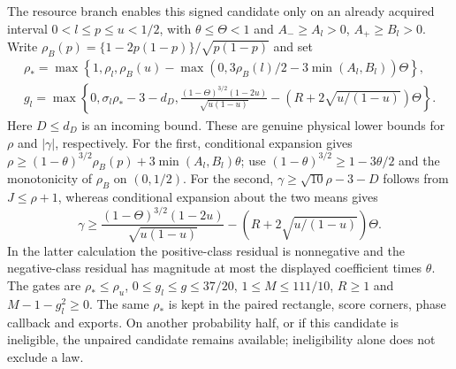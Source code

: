 The resource branch enables this signed candidate only on an already
acquired interval $0<l\le p\le u<1/2$, with $\theta\le\Theta<1$
and $A_-\ge A_l>0$, $A_+\ge B_l>0$.
Write $\rho_B(p)=\{1-2p(1-p)\}/\sqrt{p(1-p)}$ and set
\begin{gather*}
 \rho_* =\max\left\{1,\rho_l,\rho_B(u)
       -\max(0,3\rho_B(l)/2-3\min(A_l,B_l))\Theta\right\},\\
 g_l=\max\left\{0,\sigma_l\rho_*-3-d_D,
 \frac{(1-\Theta)^{3/2}(1-2u)}{\sqrt{u(1-u)}}
                -(R+2\sqrt{u/(1-u)})\Theta\right\}.
\end{gather*}
Here $D\le d_D$ is an incoming bound. These are genuine physical
lower bounds for $\rho$ and $|\gamma|$, respectively.
For the first, conditional expansion gives
$\rho\ge(1-\theta)^{3/2}\rho_B(p)+3\min(A_l,B_l)\theta$;
use $(1-\theta)^{3/2}\ge1-3\theta/2$ and the monotonicity of
$\rho_B$ on $(0,1/2)$.
For the second, $\gamma\ge\sqrt{10}\rho-3-D$ follows from
$J\le\rho+1$, whereas conditional expansion about the two means gives
\[
 \gamma\ge\frac{(1-\Theta)^{3/2}(1-2u)}{\sqrt{u(1-u)}}
                     -(R+2\sqrt{u/(1-u)})\Theta.
\]
In the latter calculation the positive-class residual is nonnegative
and the negative-class residual has magnitude at most the displayed
coefficient times $\theta$.
The gates are $\rho_*\le\rho_u$, $0\le g_l\le g\le37/20$,
$1\le M\le111/10$, $R\ge1$ and $M-1-g_l^2\ge0$.
The same $\rho_*$ is kept in the paired rectangle, score corners,
phase callback and exports. On another probability half, or if this
candidate is ineligible, the unpaired candidate remains available;
ineligibility alone does not exclude a law.

